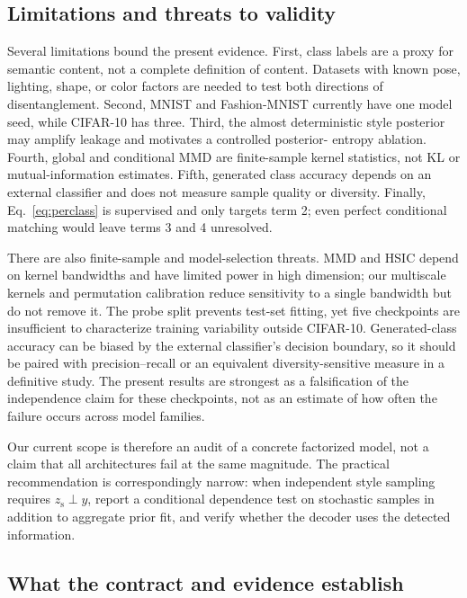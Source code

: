\documentclass{article}
\newcommand{\zs}{z_{\mathrm{s}}}
\begin{document}
\subsection{Limitations and threats to validity}

Several limitations bound the present evidence.  First, class labels are a
proxy for semantic content, not a complete definition of content.  Datasets
with known pose, lighting, shape, or color factors are needed to test both
directions of disentanglement.  Second, MNIST and Fashion-MNIST currently have
one model seed, while CIFAR-10 has three.  Third, the almost deterministic
style posterior may amplify leakage and motivates a controlled posterior-
entropy ablation.  Fourth, global and conditional MMD are finite-sample
kernel statistics, not KL or mutual-information estimates.  Fifth, generated
class accuracy depends on an external classifier and does not measure sample
quality or diversity.  Finally, Eq.~\ref{eq:perclass} is supervised and only
targets term 2; even perfect conditional matching would leave terms 3 and 4
unresolved.

There are also finite-sample and model-selection threats.  MMD and HSIC depend
on kernel bandwidths and have limited power in high dimension; our multiscale
kernels and permutation calibration reduce sensitivity to a single bandwidth
but do not remove it.  The probe split prevents test-set fitting, yet five
checkpoints are insufficient to characterize training variability outside
CIFAR-10.  Generated-class accuracy can be biased by the external classifier's
decision boundary, so it should be paired with precision--recall or an
equivalent diversity-sensitive measure in a definitive study.  The present
results are strongest as a falsification of the independence claim for these
checkpoints, not as an estimate of how often the failure occurs across model
families.

Our current scope is therefore an audit of a concrete factorized model, not a
claim that all architectures fail at the same magnitude.  The practical
recommendation is correspondingly narrow: when independent style sampling
requires $\zs\perp y$, report a conditional dependence test on stochastic
samples in addition to aggregate prior fit, and verify whether the decoder
uses the detected information.

\fi

\subsection{What the contract and evidence establish}
\end{document}
